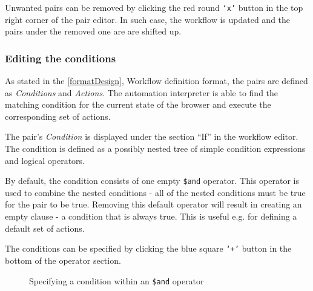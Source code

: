 Unwanted pairs can be removed by clicking the red round \texttt{`x'} button in the top right corner of the pair editor.
In such case, the workflow is updated and the pairs under the removed one are are shifted up.
\clearpage
\subsubsection{Editing the conditions}

As stated in the \autoref{formatDesign}, Workflow definition format, the pairs are defined as \textit{Conditions} and \textit{Actions}.
The automation interpreter is able to find the matching condition for the current state of the browser and execute the corresponding set of actions.

The pair's \textit{Condition} is displayed under the section ``If'' in the workflow editor.
The condition is defined as a possibly nested tree of simple condition expressions and logical operators.

By default, the condition consists of one empty \texttt{\$and} operator. 
This operator is used to combine the nested conditions - all of the nested conditions must be true for the pair to be true.
Removing this default operator will result in creating an empty clause - a condition that is always true.
This is useful e.g. for defining a default set of actions.

The conditions can be specified by clicking the blue square \texttt{`+'} button in the bottom of the operator section.

\begin{figure}[!h]
    \begin{center}
    \end{center}
    \caption{Specifying a condition within an \texttt{\$and} operator} \label{fig:tutorialAnd}
\end{figure}

